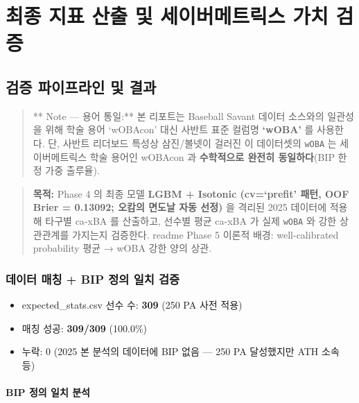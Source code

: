 \documentclass[
  11.5pt,
]{article}
\providecommand{\tightlist}{%
  \setlength{\itemsep}{0pt}\setlength{\parskip}{0pt}}
\begin{document}
\section{최종 지표 산출 및 세이버메트릭스 가치
검증}\label{uxcd5cuxc885-uxc9c0uxd45c-uxc0b0uxcd9c-uxbc0f-uxc138uxc774uxbc84uxba54uxd2b8uxb9aduxc2a4-uxac00uxce58-uxac80uxc99d}

\subsection{검증 파이프라인 및
결과}\label{uxac80uxc99d-uxd30cuxc774uxd504uxb77cuxc778-uxbc0f-uxacb0uxacfc}

\begin{quote}
** Note --- 용어 통일:** 본 리포트는 Baseball Savant 데이터 소스와의
일관성을 위해 학술 용어 `wOBAcon' 대신 사반트 표준 컬럼명
\textbf{`wOBA'} 를 사용한다. 단, 사반트 리더보드 특성상 삼진/볼넷이
걸러진 이 데이터셋의 \texttt{wOBA} 는 세이버메트릭스 학술 용어인 wOBAcon
과 \textbf{수학적으로 완전히 동일하다}(BIP 한정 가중 출루율).
\end{quote}

\begin{quote}
\textbf{목적:} Phase 4 의 최종 모델 \textbf{LGBM + Isotonic (cv=`prefit'
패턴, OOF Brier = 0.13092; 오캄의 면도날 자동 선정)} 을 격리된 2025
데이터에 적용해 타구별 ca-xBA 를 산출하고, 선수별 평균 ca-xBA 가 실제
\texttt{wOBA} 와 강한 상관관계를 가지는지 검증한다. readme Phase 5
이론적 배경: well-calibrated probability 평균 → wOBA 강한 양의 상관.
\end{quote}

\subsubsection{데이터 매칭 + BIP 정의 일치
검증}\label{uxb370uxc774uxd130-uxb9e4uxce6d-bip-uxc815uxc758-uxc77cuxce58-uxac80uxc99d}

\begin{itemize}
\tightlist
\item
  expected\_stats.csv 선수 수: \textbf{309} (250 PA 사전 적용)
\item
  매칭 성공: \textbf{309/309} (100.0\%)
\item
  누락: 0 (2025 본 분석의 데이터에 BIP 없음 --- 250 PA 달성했지만 ATH
  소속 등)
\end{itemize}

\paragraph{BIP 정의 일치
분석}\label{bip-uxc815uxc758-uxc77cuxce58-uxbd84uxc11d}
\end{document}
